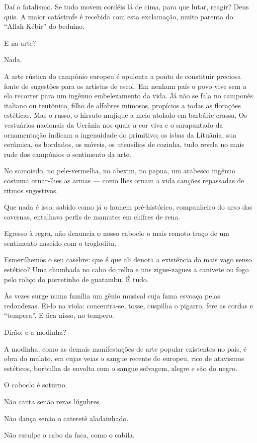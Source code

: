Daí o fatalismo. Se tudo movem cordéis lá de cima, para que lutar,
reagir? Deus quis. A maior catástrofe é recebida com esta exclamação,
muito parenta do ``Allah Kébir'' do beduíno.

E na arte?

Nada.

A arte rústica do campônio europeu é opulenta a ponto de constituir
preciosa fonte de sugestões para os artistas de escol. Em nenhum país o
povo vive sem a ela recorrer para um ingênuo embelezamento da vida. Já
não se fala no camponês italiano ou teutônico, filho de alfobres
mimosos, propícios a todas as florações estéticas. Mas o russo, o
hirsuto mujique a meio atolado em barbárie crassa. Os vestuários
nacionais da Ucrânia nos quais a cor viva e o sarapantado da
ornamentação indicam a ingenuidade do primitivo; os isbas da Lituânia,
sua cerâmica, os bordados, os móveis, os utensílios de cozinha, tudo
revela no mais rude dos campônios o sentimento da arte.

No samoiedo, no pele-vermelha, no abexim, no papua, um arabesco ingênuo
costuma ornar-lhes as armas --- como lhes ornam a vida canções
repassadas de ritmos sugestivos.

Que nada é isso, sabido como já o homem pré-histórico, companheiro do
urso das cavernas, entalhava perfis de mamutes em chifres de rena.

Egresso à regra, não denuncia o nosso caboclo o mais remoto traço de um
sentimento nascido com o troglodita.

Esmerilhemos o seu casebre: que é que ali denota a existência do mais
vago senso estético? Uma chumbada no cabo do relho e uns zigue-zagues a
canivete ou fogo pelo roliço do porretinho de guatambu. É tudo.

Às vezes surge numa família um gênio musical cuja fama esvoaça pelas
redondezas. Ei-lo na viola: concentra-se, tosse, cuspilha o pigarro,
fere as cordas e ``tempera''. E fica nisso, no tempero.

Dirão: e a modinha?

A modinha, como as demais manifestações de arte popular existentes no
país, é obra do mulato, em cujas veias o sangue recente do europeu, rico
de atavismos estéticos, borbulha de envolta com o sangue selvagem,
alegre e são do negro.

O caboclo é soturno.

Não canta senão rezas lúgubres.

Não dança senão o cateretê aladainhado.

Não esculpe o cabo da faca, como o cabila.

